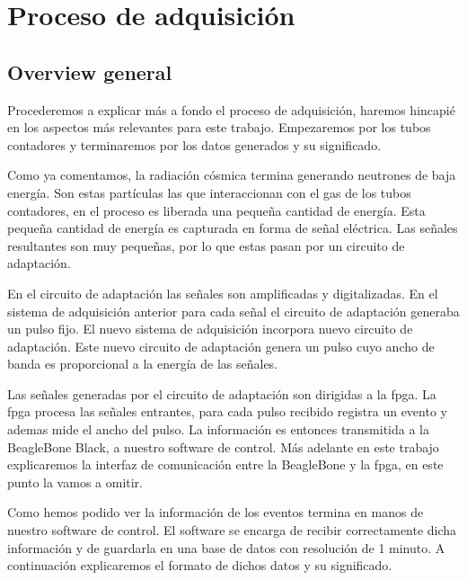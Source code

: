 \section{Proceso de adquisición}
	\subsection{Overview general}
		Procederemos a explicar más a fondo el proceso de adquisición, haremos hincapié en los aspectos más relevantes para este trabajo. Empezaremos
		por los tubos contadores y terminaremos por los datos generados y su significado.
		\par
		Como ya comentamos, la radiación cósmica termina generando neutrones de baja energía. Son estas partículas las que interaccionan con el gas de
		los tubos contadores, en el proceso es liberada una pequeña cantidad de energía.  Esta pequeña cantidad de energía es capturada en forma de
		señal eléctrica. Las señales resultantes son muy pequeñas, por lo que estas pasan por un circuito de adaptación. 
		\par
		En el circuito de adaptación las señales son amplificadas y digitalizadas. En el sistema de adquisición anterior para cada señal el circuito
		de adaptación generaba un pulso fijo. El nuevo sistema de adquisición incorpora nuevo circuito de adaptación. Este nuevo circuito de
		adaptación genera un pulso cuyo ancho de banda es proporcional a la energía de las señales. 
		\par
		Las señales generadas por el circuito de adaptación son dirigidas a la \gls{fpga}. La \gls{fpga} procesa las señales entrantes, para cada pulso recibido
		registra un evento y ademas mide el ancho del pulso. La información es entonces transmitida a la BeagleBone Black, a nuestro software de
		control. Más adelante en este trabajo explicaremos la interfaz de comunicación entre la BeagleBone y la \gls{fpga}, en este punto la vamos a omitir. 
		\par
		Como hemos podido ver la información de los eventos termina en manos de nuestro software de control. El software se encarga de recibir
		correctamente dicha información y de guardarla en una base de datos con resolución de 1 minuto. A continuación explicaremos el formato de
		dichos datos y su significado. 

